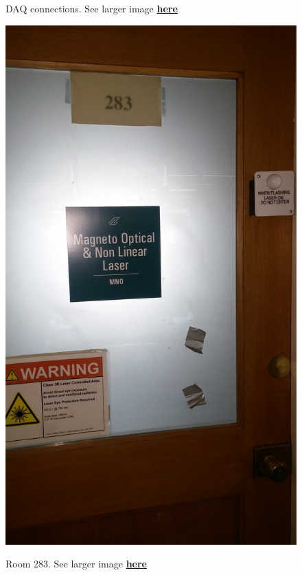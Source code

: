 \documentclass{../lab}
\begin{document}
\begin{figure}[H]
\begin{minipage}[t]{0.40\textwidth}
    \caption{DAQ connections. See larger image \href{http://experimentationlab.berkeley.edu/sites/default/files/IMG\_4081.JPG}{\textbf{here}}}
\end{minipage}
\begin{minipage}[t]{0.17\textwidth}
    \href{http://experimentationlab.berkeley.edu/sites/default/files/MNOroom283.jpg}{\includegraphics[width=\linewidth,keepaspectratio]{images/MNOroom283.jpg}}
    \caption{Room 283. See larger image \href{http://experimentationlab.berkeley.edu/sites/default/files/images/MNOroom283.jpg}{\textbf{here}}}
\end{minipage}
\end{figure}
\end{document}

